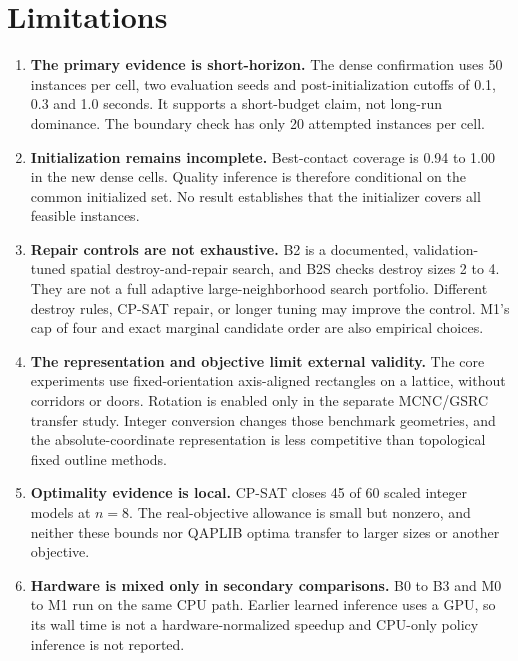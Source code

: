 \documentclass[preprint,12pt,authoryear]{elsarticle}
\begin{document}
\section{Limitations}
\label{sec:limitations}

\begin{enumerate}
\item \textbf{The primary evidence is short-horizon.} The dense confirmation
uses 50 instances per cell, two evaluation seeds and post-initialization cutoffs
of 0.1, 0.3 and 1.0 seconds. It supports a short-budget claim, not long-run
dominance. The boundary check has only 20 attempted instances per cell.

\item \textbf{Initialization remains incomplete.} Best-contact coverage is 0.94
to 1.00 in the new dense cells. Quality inference is therefore conditional on
the common initialized set. No result establishes that the initializer covers
all feasible instances.

\item \textbf{Repair controls are not exhaustive.} B2 is a documented,
validation-tuned spatial destroy-and-repair search, and B2S checks destroy sizes
2 to 4. They are not a full adaptive large-neighborhood search portfolio.
Different destroy rules, CP-SAT repair, or longer tuning may improve the
control. M1's cap of four and exact marginal candidate order are also empirical
choices.

\item \textbf{The representation and objective limit external validity.}
The core experiments use fixed-orientation axis-aligned rectangles on a lattice,
without corridors or doors. Rotation is enabled only in the separate MCNC/GSRC
transfer study. Integer conversion changes those benchmark geometries, and the
absolute-coordinate representation is less competitive than topological fixed
outline methods.

\item \textbf{Optimality evidence is local.} CP-SAT closes 45 of 60 scaled
integer models at $n=8$. The real-objective allowance is small but nonzero, and
neither these bounds nor QAPLIB optima transfer to larger sizes or another
objective.

\item \textbf{Hardware is mixed only in secondary comparisons.} B0 to B3 and
M0 to M1 run on the same CPU path. Earlier learned inference uses a GPU, so its
wall time is not a hardware-normalized speedup and CPU-only policy inference is
not reported.
\end{enumerate}
\end{document}
